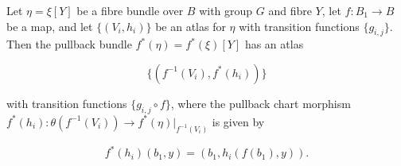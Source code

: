 Let $\eta = \xi[Y]$ be a fibre bundle over $B$ with group $G$ and fibre $Y$, let $f: B_1 \to B$ be a map, and let $\{(V_i, h_i)\}$ be an atlas for $\eta$ with transition functions $\{g_{i,j}\}$. Then the pullback bundle $f^*(\eta) = f^*(\xi)[Y]$ has an atlas

$$\{(f^{-1}(V_i), f^*(h_i))\}$$

with transition functions $\{g_{i,j} \circ f\}$, where the pullback chart morphism $f^*(h_i): \theta(f^{-1}(V_i)) \to f^*(\eta)|_{f^{-1}(V_i)}$ is given by

$$f^*(h_i)(b_1, y) = (b_1, h_i(f(b_1), y)).$$
